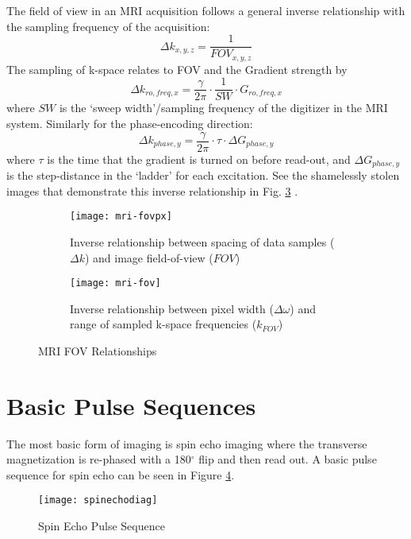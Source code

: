 The field of view in an MRI acquisition follows a general inverse relationship with the sampling frequency of the acquisition:
\begin{equation}
\Delta k_{x,y,z} = \frac{1}{FOV_{x,y,z}}
\end{equation}
The sampling of k-space relates to FOV and the Gradient strength by
\begin{equation}
\Delta k_{ro,freq,x} = \frac{\gamma}{2\pi}  \cdot\frac{1}{SW}\cdot G_{ro,freq,x}
\end{equation}
where $SW$ is the `sweep width'/sampling frequency of the digitizer in the MRI system. Similarly for the phase-encoding direction:
\begin{equation}
\Delta k_{phase,y} = \frac{\gamma}{2\pi}  \cdot\tau\cdot\Delta G_{phase,y}
\end{equation}
where $\tau$ is the time that the gradient is turned on before read-out, and $\Delta G_{phase,y}$ is the step-distance in the `ladder' for each excitation.
See the shamelessly stolen images that demonstrate this inverse relationship in Fig. \ref{fig:mri:fov} .
\begin{figure}[ht]
	\centering
	\begin{subfigure}[b]{0.45\textwidth}
		\centering
		\texttt{[image: mri-fovpx]}
		\caption{Inverse relationship between spacing of data samples ($\Delta k$) and image field-of-view ($FOV$)}
		\label{fig:mri:fovpx}
	\end{subfigure}\hfill
	\begin{subfigure}[b]{0.45\textwidth}
		\centering
		\texttt{[image: mri-fov]}
		\caption{Inverse relationship between pixel width ($\Delta \omega$) and range of sampled k-space frequencies ($k_{FOV}$)}
		\label{fig:mri:fovsame}
	\end{subfigure}
	\caption{MRI FOV Relationships}\label{fig:mri:fov}
\end{figure} 

\section{Basic Pulse Sequences}

The most basic form of imaging is spin echo imaging where the transverse magnetization is re-phased with a 180$^\circ$ flip and then read out.  A basic pulse sequence for spin echo can be seen in Figure \ref{fig:mri:spinecho1}.

\begin{figure}[h]
	\centering
	\texttt{[image: spinechodiag]}	
	\caption{Spin Echo Pulse Sequence}
\label{fig:mri:spinecho1}
\end{figure}

